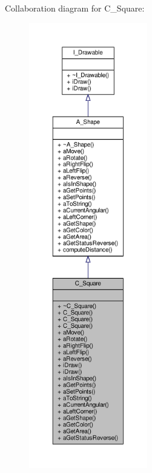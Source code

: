 Collaboration diagram for C\+\_\+\+Square\+:
\nopagebreak
\begin{figure}[H]
\begin{center}
\leavevmode
\includegraphics[height=550pt]{classC__Square__coll__graph}
\end{center}
\end{figure}
